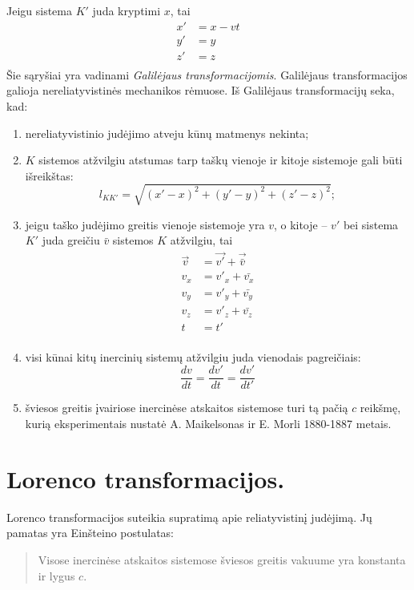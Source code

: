 Jeigu sistema $K'$ juda kryptimi $x$, tai
\begin{align*}
  x' &= x - vt \\
  y' &= y \\
  z' &= z \\
\end{align*}
Šie sąryšiai yra vadinami \emph{Galilėjaus transformacijomis}.
Galilėjaus transformacijos galioja nereliatyvistinės mechanikos rėmuose.
Iš Galilėjaus transformacijų seka, kad:
\begin{enumerate}
  \item nereliatyvistinio judėjimo atveju kūnų matmenys nekinta;
  \item $K$ sistemos atžvilgiu atstumas tarp taškų vienoje ir kitoje
    sistemoje gali būti išreikštas:
    \begin{equation*}
      l_{KK'} = \sqrt{(x'-x)^{2} + (y'-y)^{2} + (z'-z)^{2}};
    \end{equation*}
  \item jeigu taško judėjimo greitis vienoje sistemoje yra $v$, o
    kitoje – $v'$ bei sistema $K'$ juda greičiu $\bar{v}$ sistemos
    $K$ atžvilgiu, tai
    \begin{align*}
      \vec{v} &= \vec{v'} + \vec{\bar{v}} \\
      v_{x} &= v'_{x} + \bar{v_{x}} \\
      v_{y} &= v'_{y} + \bar{v_{y}} \\
      v_{z} &= v'_{z} + \bar{v_{z}} \\
      t &= t' \\
    \end{align*}
  \item visi kūnai kitų inercinių sistemų atžvilgiu juda vienodais
    pagreičiais:
    \begin{equation*}
      \frac{dv}{dt} = \frac{dv'}{dt} = \frac{dv'}{dt'}
    \end{equation*}
  \item šviesos greitis įvairiose inercinėse atskaitos sistemose turi tą
    pačią $c$ reikšmę, kurią eksperimentais nustatė A. Maikelsonas ir
    E. Morli 1880-1887 metais.
\end{enumerate}

\section{Lorenco transformacijos.}

Lorenco transformacijos suteikia supratimą apie reliatyvistinį judėjimą.
Jų pamatas yra Einšteino postulatas:
\begin{quote}
  Visose inercinėse atskaitos sistemose šviesos greitis vakuume yra
  konstanta ir lygus $c$.
\end{quote}

